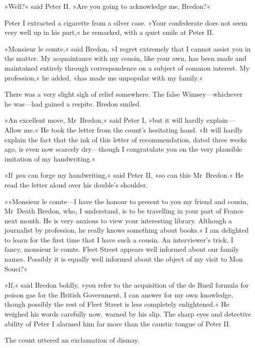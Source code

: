 »Well?« said Peter II. »Are you going to acknowledge me, Bredon?«

Peter I extracted a cigarette from a silver case. »Your confederate does not seem very well up in his part,« he remarked, with a quiet smile at Peter II.

»Monsieur le comte,« said Bredon, »I regret extremely that I cannot assist you in the matter. My acquaintance with my cousin, like your own, has been made and maintained entirely through correspondence on a subject of common interest. My profession,« he added, »has made me unpopular with my family.«

There was a very slight sigh of relief somewhere. The false Wimsey—whichever he was—had gained a respite. Bredon smiled.

»An excellent move, Mr~Bredon,« said Peter I, »but it will hardly explain—Allow me.« He took the letter from the count's hesitating hand. »It will hardly explain the fact that the ink of this letter of recommendation, dated three weeks ago, is even now scarcely dry—though I congratulate you on the very plausible imitation of my handwriting.«

»If \textit{you} can forge my handwriting,« said Peter II, »so can this Mr~Bredon.« He read the letter aloud over his double's shoulder.

»»Monsieur le comte—I have the honour to present to you my friend and cousin, Mr~Death Bredon, who, I understand, is to be travelling in your part of France next month. He is very anxious to view your interesting library. Although a journalist by profession, he really knows something about books.« I am delighted to learn for the first time that I have such a cousin. An interviewer's trick, I fancy, monsieur le comte. Fleet Street appears well informed about our family names. Possibly it is equally well informed about the object of my visit to Mon Souci?«

»If,« said Bredon boldly, »you refer to the acquisition of the de Rueil formula for poison gas for the British Government, I can answer for my own knowledge, though possibly the rest of Fleet Street is less completely enlightened.« He weighed his words carefully now, warned by his slip. The sharp eyes and detective ability of Peter I alarmed him far more than the caustic tongue of Peter II.

The count uttered an exclamation of dismay.

